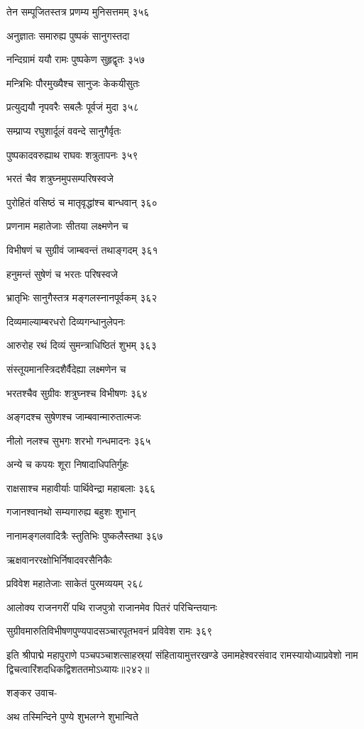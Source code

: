 तेन सम्पूजितस्तत्र प्रणम्य मुनिसत्तमम् ३५६

अनुज्ञातः समारुह्य पुष्पकं सानुगस्तदा

नन्दिग्रामं ययौ रामः पुष्पकेण सुहृद्वृतः ३५७

मन्त्रिभिः पौरमुख्यैश्च सानुजः केकयीसुतः

प्रत्युद्ययौ नृपवरैः सबलैः पूर्वजं मुदा ३५८

सम्प्राप्य रघुशार्दूलं ववन्दे सानुगैर्वृतः

पुष्पकादवरुह्याथ राघवः शत्रुतापनः ३५९

भरतं चैव शत्रुघ्नमुपसम्परिषस्वजे

पुरोहितं वसिष्ठं च मातृवृद्धांश्च बान्धवान् ३६०

प्रणनाम महातेजाः सीतया लक्ष्मणेन च

विभीषणं च सुग्रीवं जाम्बवन्तं तथाङ्गदम् ३६१

हनुमन्तं सुषेणं च भरतः परिषस्वजे

भ्रातृभिः सानुगैस्तत्र मङ्गलस्नानपूर्वकम् ३६२

दिव्यमाल्याम्बरधरो दिव्यगन्धानुलेपनः

आरुरोह रथं दिव्यं सुमन्त्राधिष्ठितं शुभम् ३६३

संस्तूयमानस्त्रिदशैर्वैदेह्या लक्ष्मणेन च

भरतश्चैव सुग्रीवः शत्रुघ्नश्च विभीषणः ३६४

अङ्गदश्च सुषेणश्च जाम्बवान्मारुतात्मजः

नीलो नलश्च सुभगः शरभो गन्धमादनः ३६५

अन्ये च कपयः शूरा निषादाधिपतिर्गुहः

राक्षसाश्च महावीर्याः पार्थिवेन्द्रा महाबलाः ३६६

गजानश्वानथो सम्यगारुह्य बहुशः शुभान्

नानामङ्गलवादित्रैः स्तुतिभिः पुष्कलैस्तथा ३६७

ऋक्षवानररक्षोभिर्निषादवरसैनिकैः

प्रविवेश महातेजाः साकेतं पुरमव्ययम् २६८

आलोक्य राजनगरीं पथि राजपुत्रो राजानमेव पितरं परिचिन्तयानः

सुग्रीवमारुतिविभीषणपुण्यपादसञ्चारपूतभवनं प्रविवेश रामः ३६९

इति श्रीपाद्मे महापुराणे पञ्चपञ्चाशत्साहस्र्यां संहितायामुत्तरखण्डे उमामहेश्वरसंवाद रामस्यायोध्याप्रवेशो नाम द्विचत्वारिंशदधिकद्विशततमोऽध्यायः॥२४२॥


शङ्कर उवाच-

अथ तस्मिन्दिने पुण्ये शुभलग्ने शुभान्विते

